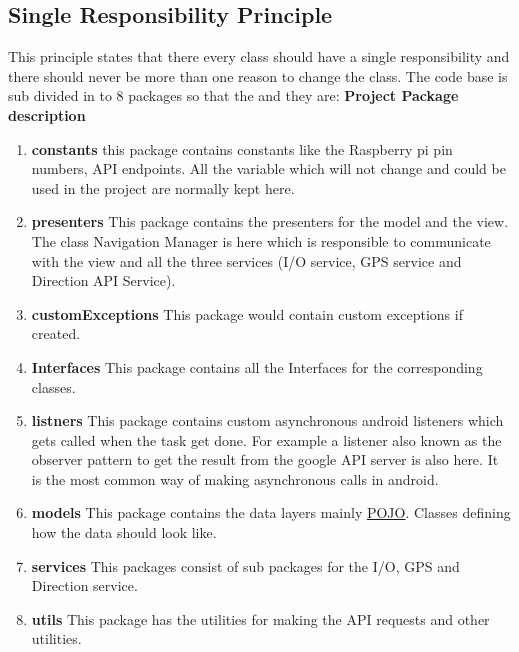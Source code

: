 \subsection{Single Responsibility Principle}
    This principle states that there every class should have a single responsibility
    and there should never be more than one reason to change the class. 
    The code base is sub divided in to 8 packages so that the  and they are:
    \newpage
    \textbf{Project Package description}
    \begin{enumerate}
        \item 
            \textbf{constants} 
                this package contains constants like the Raspberry pi pin 
                numbers, API endpoints. All the variable which will not 
                change and could be used in the project are normally kept here.
        \item 
            \textbf{presenters} 
                This package contains the presenters for the model and the view.
                The class Navigation Manager is here which is responsible to communicate
                with the view and all the three services (I/O service, GPS service and 
                Direction API Service).  
        \item 
            \textbf{customExceptions}
                This package would contain custom exceptions if created.
        \item 
            \textbf{Interfaces}
                This package contains all the Interfaces for the corresponding classes. 
        \item 
            \textbf{listners}
                This package contains custom asynchronous android listeners which gets 
                called when the task get done. For example a listener also known as the
                observer pattern \cite{Hotop2015} to get the result
                from the google API server is also here. It is the most common way of
                making asynchronous calls in android.
        \item 
            \textbf{models}
            This package contains the data layers mainly 
            \href{https://spring.io/understanding/POJO}  {POJO}. Classes defining how the
            data should look like.
        \item 
            \textbf{services} 
                This packages consist of sub packages for the I/O, GPS and Direction service.
        \item 
            \textbf{utils}
                This package has the utilities for making the API requests and other utilities. 
    \end{enumerate}

